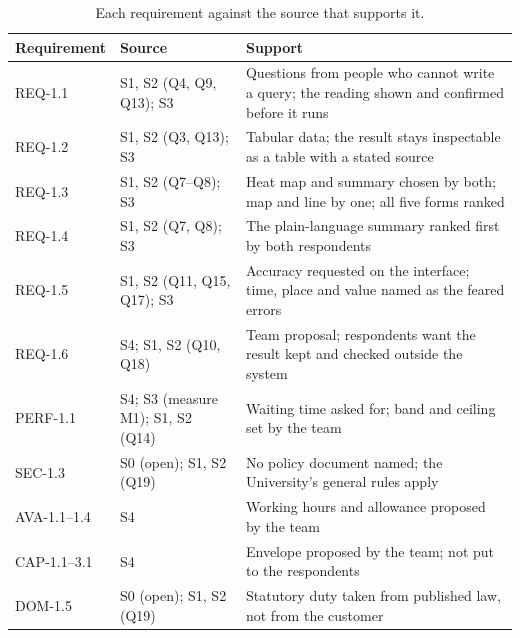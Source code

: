\documentclass[12pt,a4paper]{report}
\begin{document}
\begin{table}[H]
  \centering
  \caption{Each requirement against the source that supports it.}
  \label{tab:trace}
  \small
  \setlength{\tabcolsep}{4.5pt}
  \begin{tabular}{@{}l >{\raggedright\arraybackslash}p{5.0cm}
                    >{\raggedright\arraybackslash}p{8.2cm}@{}}
    \toprule[1.5pt]
    \textbf{Requirement} & \textbf{Source} & \textbf{Support} \\
    \midrule
    REQ-1.1 & S1, S2 (Q4, Q9, Q13); S3 & Questions from people who cannot
      write a query; the reading shown and confirmed before it runs \\
    \addlinespace
    REQ-1.2 & S1, S2 (Q3, Q13); S3 & Tabular data; the result stays
      inspectable as a table with a stated source \\
    \addlinespace
    REQ-1.3 & S1, S2 (Q7--Q8); S3 & Heat map and summary chosen by both; map
      and line by one; all five forms ranked \\
    \addlinespace
    REQ-1.4 & S1, S2 (Q7, Q8); S3 & The plain-language summary ranked first by
      both respondents \\
    \addlinespace
    REQ-1.5 & S1, S2 (Q11, Q15, Q17); S3 & Accuracy requested on the
      interface; time, place and value named as the feared errors \\
    \addlinespace
    REQ-1.6 & S4; S1, S2 (Q10, Q18) & Team proposal; respondents want the
      result kept and checked outside the system \\
    \addlinespace
    PERF-1.1 & S4; S3 (measure M1); S1, S2 (Q14) & Waiting time asked for;
      band and ceiling set by the team \\
    \addlinespace
    SEC-1.3 & S0 (open); S1, S2 (Q19) & No policy document named; the
      University's general rules apply \\
    \addlinespace
    AVA-1.1--1.4 & S4 & Working hours and allowance proposed by the team \\
    \addlinespace
    CAP-1.1--3.1 & S4 & Envelope proposed by the team; not put to the
      respondents \\
    \addlinespace
    DOM-1.5 & S0 (open); S1, S2 (Q19) & Statutory duty taken from published
      law, not from the customer \\
    \bottomrule[1.5pt]
  \end{tabular}
\end{table}
\end{document}
